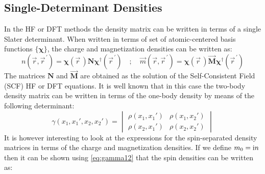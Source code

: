 \documentclass[12pt]{article}
\newcommand{\iu}{\ensuremath\mathrm{i}}
\begin{document}
\subsection{Single-Determinant Densities}
In the HF or DFT methods the density matrix can be written in terms of a single Slater determinant.
When written in terms of set of atomic-centered basis functions $\{\bm{\chi}\}$, the charge and magnetization densities can be written as:
\begin{equation}
 n(\vec{r},\vec{r}^{\,\prime}) = \bm{\chi}(\vec{r}\,)\mathbf{N}\bm{\chi}^\dagger(\vec{r}^{\,\prime}) \quad;\quad
 \vec{m}(\vec{r},\vec{r}^{\,\prime}) = \bm{\chi}(\vec{r}\,)\vec{\mathbf{M}}\bm{\chi}^\dagger(\vec{r}^{\,\prime})
\end{equation}
The matrices $\mathbf{N}$ and $\vec{\mathbf{M}}$ are obtained as the solution of the Self-Consistent Field (SCF) HF or DFT equations.
It is well known that in this case the two-body density matrix can be written in terms of the one-body density by means of the following determinant:
\begin{equation}
 \gamma(x_1,x_1',x_2,x_2') = \begin{vmatrix} \rho(x_1,x_1') & \rho(x_1,x_2') \\\rho(x_2,x_1') & \rho(x_2,x_2') \end{vmatrix}
\end{equation}
It is however interesting to look at the expressions for the spin-separated density matrices in terms of the charge and magnetization densities.
If we define $m_0=\iu n$ then it can be shown using \cref{eq:gamma12} that the spin densities can be written as:
\end{document}

